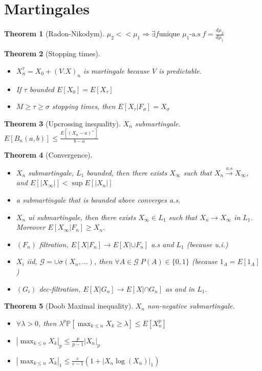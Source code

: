 \documentclass{article}
\newtheorem{theorem}{Theorem}
\begin{document}
\section{Martingales}
\begin{theorem}[Radon-Nikodym]
  $\mu_2 << \mu_1 \Rightarrow \exists f \text{unique $\mu_1$-a.s} \; f = \frac{d\mu_2}{d\mu_1}$
\end{theorem}
\begin{theorem}[Stopping times]
  \begin{itemize}
  \item $X_n^{\tau} = X_0 + (V.X)_n$ is martingale because $V$ is
    predictable.
  \item If $\tau$ bounded $E[X_0] = E[X_{\tau}]$
  \item $M \ge \tau \ge \sigma$ stopping times, then $E[X_{\tau} | F_{\sigma}] = X_{\sigma}$
  \end{itemize}
  
\end{theorem}
\begin{theorem}[Upcrossing inequality]
  $X_n$ submartingale. $E[B_n(a, b)] \le \frac{E[(X_n - a)^+]}{b - a}$
\end{theorem}
\begin{theorem}[Convergence]
  \begin{itemize}
  \item $X_n$ submartingale, $L_1$ bounded, then there exists  $X_{\infty}$ such that  $X_n \overset{a.s}{\rightarrow} X_{\infty}$, and  $E[|X_\infty|] < \sup E[|X_n|]$
  \item a submartingale that is bounded above converges a.s.
  \item $X_n$ ui submartingale, then there exists $X_{\infty} \in L_1$ such that $X_n \rightarrow X_{\infty}$ in $L_1$. Moreover $E[X_{\infty} | F_n] \ge X_n$.
  \item $(F_n)$ filtration, $E[X | F_n] \rightarrow E[X | \cup F_n]$ a.s and $L_1$ (because u.i.)
  \item $X_i$ iid, $\mathcal G = \cup \sigma(X_n, \ldots)$, then $\forall A \in \mathcal G \; P(A) \in \{0, 1\}$ (because $1_A = E[1_A]$)
  \item $(G_i)$ dec-filtration, $E[X | G_n ] \rightarrow E[X | \cap G_n]$ as and in $L_1$.
  \end{itemize}
\end{theorem}
\begin{theorem}[Doob Maximal inequality]
  $X_n$ non-negative submartingale.
  \begin{itemize}
  \item $\forall \lambda > 0$, then $\lambda^p \mathbb P[\max_{k \le n} X_k \ge \lambda] \le E[X_n^p]$
  \item $|\max_{k \le n} X_k|_p \le \frac{p}{p-1} |X_n|_p$
  \item $|\max_{k \le n} X_k|_1 \le \frac{e}{e-1} (1 + |X_n\log(X_n)|_1)$
  \end{itemize}
\end{theorem}
\end{document}
